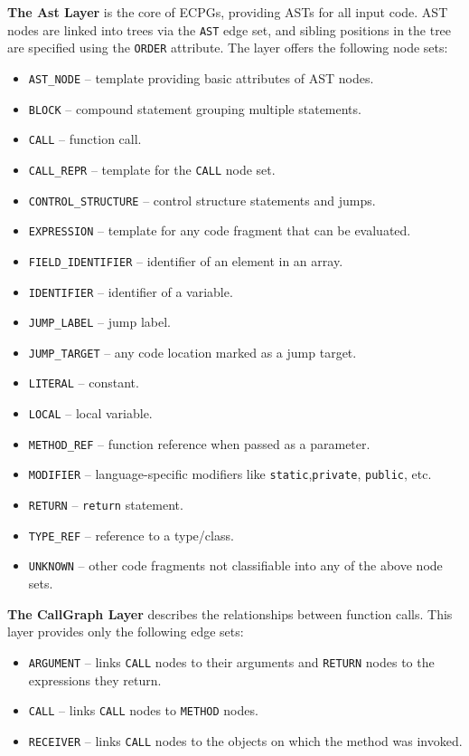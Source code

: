 \textbf{The Ast Layer} is the core of ECPGs, providing ASTs for all input code. AST nodes are linked into trees via the \texttt{AST} edge set, and sibling positions in the tree are specified using the \texttt{ORDER} attribute. The layer offers the following node sets:
\begin{itemize}
    \item \texttt{AST\_NODE} -- template providing basic attributes of AST nodes.
    \item \texttt{BLOCK} -- compound statement grouping multiple statements.
    \item \texttt{CALL} -- function call.
    \item \texttt{CALL\_REPR} -- template for the \texttt{CALL} node set.
    \item \texttt{CONTROL\_STRUCTURE} -- control structure statements and jumps.
    \item \texttt{EXPRESSION} -- template for any code fragment that can be evaluated.
    \item \texttt{FIELD\_IDENTIFIER} -- identifier of an element in an array.
    \item \texttt{IDENTIFIER} -- identifier of a variable.
    \item \texttt{JUMP\_LABEL} -- jump label.
    \item \texttt{JUMP\_TARGET} -- any code location marked as a jump target.
    \item \texttt{LITERAL} -- constant.
    \item \texttt{LOCAL} -- local variable.
    \item \texttt{METHOD\_REF} -- function reference when passed as a parameter.
    \item \texttt{MODIFIER} -- language-specific modifiers like \texttt{static},\texttt{private}, \texttt{public}, etc.
    \item \texttt{RETURN} -- \texttt{return} statement.
    \item \texttt{TYPE\_REF} -- reference to a type/class.
    \item \texttt{UNKNOWN} -- other code fragments not classifiable into any of the above node sets.
\end{itemize}

\textbf{The CallGraph Layer} describes the relationships between function calls. This layer provides only the following edge sets:
\begin{itemize}
    \item \texttt{ARGUMENT} -- links \texttt{CALL} nodes to their arguments and \texttt{RETURN} nodes to the expressions they return.
    \item \texttt{CALL} -- links \texttt{CALL} nodes to \texttt{METHOD} nodes.
    \item \texttt{RECEIVER} -- links \texttt{CALL} nodes to the objects on which the method was invoked.
\end{itemize}

